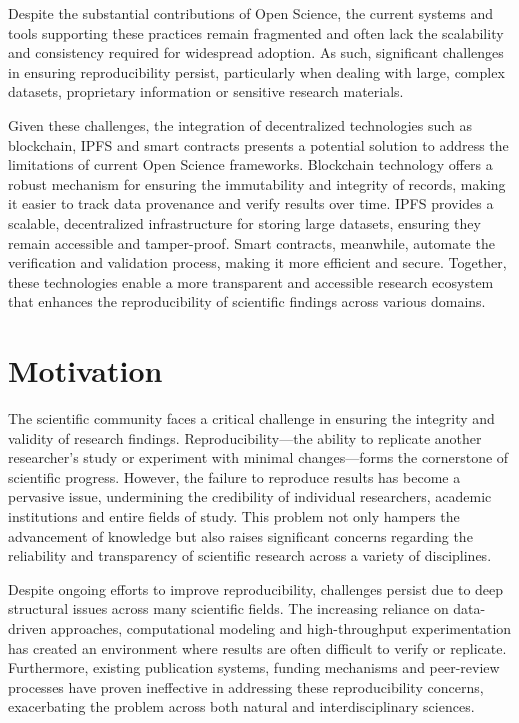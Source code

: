 \documentclass{article}
\begin{document}
Despite the substantial contributions of Open Science, the current systems and tools supporting these practices remain fragmented and often lack the scalability and consistency required for widespread adoption. As such, significant challenges in ensuring reproducibility persist, particularly when dealing with large, complex datasets, proprietary information  or sensitive research materials.

Given these challenges, the integration of decentralized technologies such as blockchain, IPFS and smart contracts presents a potential solution to address the limitations of current Open Science frameworks. Blockchain technology offers a robust mechanism for ensuring the immutability and integrity of records, making it easier to track data provenance and verify results over time. IPFS provides a scalable, decentralized infrastructure for storing large datasets, ensuring they remain accessible and tamper-proof. Smart contracts, meanwhile, automate the verification and validation process, making it more efficient and secure. Together, these technologies enable a more transparent and accessible research ecosystem that enhances the reproducibility of scientific findings across various domains.

\section{Motivation}

The scientific community faces a critical challenge in ensuring the integrity and validity of research findings. Reproducibility—the ability to replicate another researcher's study or experiment with minimal changes—forms the cornerstone of scientific progress. However, the failure to reproduce results has become a pervasive issue, undermining the credibility of individual researchers, academic institutions and entire fields of study. This problem not only hampers the advancement of knowledge but also raises significant concerns regarding the reliability and transparency of scientific research across a variety of disciplines.

Despite ongoing efforts to improve reproducibility, challenges persist due to deep structural issues across many scientific fields. The increasing reliance on data-driven approaches, computational modeling and high-throughput experimentation has created an environment where results are often difficult to verify or replicate. Furthermore, existing publication systems, funding mechanisms and peer-review processes have proven ineffective in addressing these reproducibility concerns, exacerbating the problem across both natural and interdisciplinary sciences.
\end{document}
